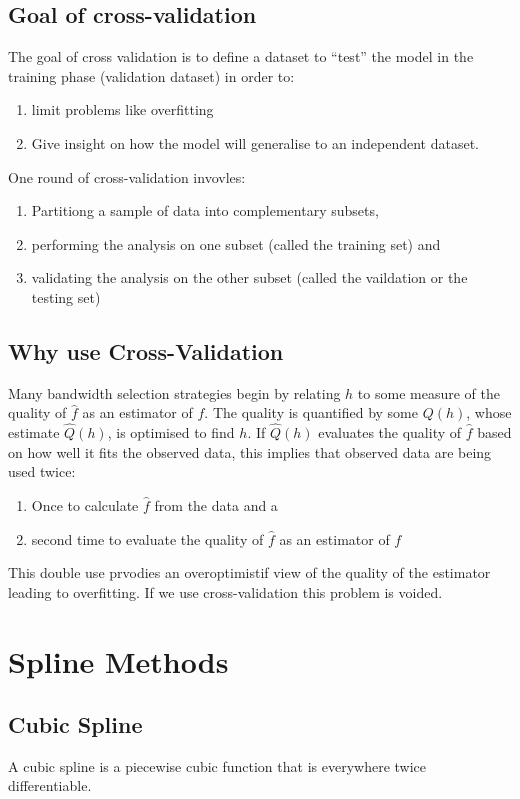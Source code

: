 \documentclass[twoside]{article}
\theoremstyle{definition}
\theoremstyle{definition}
\begin{document}
 \subsection{Goal of cross-validation}
 The goal of cross validation is to define a dataset to ``test'' the model in the training phase (validation dataset) in order to:
 \begin{enumerate}
	 \item limit problems like overfitting
	\item Give insight on how the model will generalise to an independent dataset.
 \end{enumerate}

 One round of cross-validation invovles:
 \begin{enumerate}
	 \item Partitiong a sample of data into complementary subsets,
	\item performing the analysis on one subset (called the training set) and 
	\item validating the analysis on the other subset (called the vaildation or the testing set)
 \end{enumerate}
 \subsection{Why use Cross-Validation} 

 Many bandwidth selection strategies begin by relating $h$ to
some measure of the quality of $\hat{f}$ as an estimator of $f$. The quality is quantified by some $Q(h)$, whose estimate $\hat{Q}(h)$, is optimised to find $h$. If $\hat{Q}(h)$ evaluates the quality of $\hat{f}$ based on how well it fits the observed data, this implies that observed data are being used twice:

\begin{enumerate}
\item Once to calculate $\hat{f}$ from the data and a 
\item second time to evaluate the quality of $\hat{f}$ as an estimator of $f$
\end{enumerate}

This double use prvodies an overoptimistif view of the quality of the estimator leading to overfitting. If we use cross-validation this problem is voided. 
\section{Spline Methods}
\subsection{Cubic Spline}
 A cubic spline is a piecewise cubic function that is everywhere twice differentiable.
\end{document}
